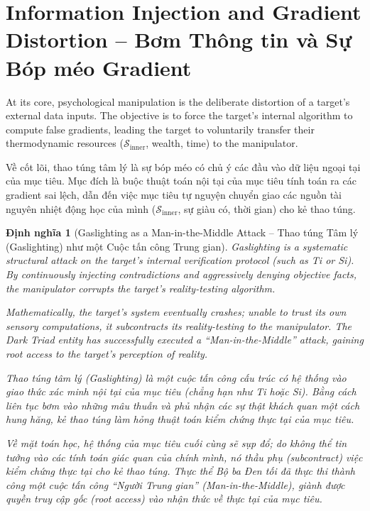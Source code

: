 \documentclass{report}
\newtheorem{dinhnghia}{Định nghĩa}
\begin{document}
\section{Information Injection and Gradient Distortion -- Bơm Thông tin và Sự Bóp méo Gradient}

At its core, psychological manipulation is the deliberate distortion of a target's external data inputs. The objective is to force the target's internal algorithm to compute false gradients, leading the target to voluntarily transfer their thermodynamic resources ($\mathcal{S}_{\text{inner}}$, wealth, time) to the manipulator.

Về cốt lõi, thao túng tâm lý là sự bóp méo có chủ ý các đầu vào dữ liệu ngoại tại của mục tiêu. Mục đích là buộc thuật toán nội tại của mục tiêu tính toán ra các gradient sai lệch, dẫn đến việc mục tiêu tự nguyện chuyển giao các nguồn tài nguyên nhiệt động học của mình ($\mathcal{S}_{\text{inner}}$, sự giàu có, thời gian) cho kẻ thao túng.

\begin{dinhnghia}[Gaslighting as a Man-in-the-Middle Attack -- Thao túng Tâm lý (Gaslighting) như một Cuộc tấn công Trung gian]
	Gaslighting is a systematic structural attack on the target's internal verification protocol (such as Ti or Si). By continuously injecting contradictions and aggressively denying objective facts, the manipulator corrupts the target's reality-testing algorithm.
	
	Mathematically, the target's system eventually crashes; unable to trust its own sensory computations, it subcontracts its reality-testing to the manipulator. The Dark Triad entity has successfully executed a ``Man-in-the-Middle'' attack, gaining root access to the target's perception of reality.
	
	Thao túng tâm lý (Gaslighting) là một cuộc tấn công cấu trúc có hệ thống vào giao thức xác minh nội tại của mục tiêu (chẳng hạn như Ti hoặc Si). Bằng cách liên tục bơm vào những mâu thuẫn và phủ nhận các sự thật khách quan một cách hung hăng, kẻ thao túng làm hỏng thuật toán kiểm chứng thực tại của mục tiêu.
	
	Về mặt toán học, hệ thống của mục tiêu cuối cùng sẽ sụp đổ; do không thể tin tưởng vào các tính toán giác quan của chính mình, nó thầu phụ (subcontract) việc kiểm chứng thực tại cho kẻ thao túng. Thực thể Bộ ba Đen tối đã thực thi thành công một cuộc tấn công ``Người Trung gian'' (Man-in-the-Middle), giành được quyền truy cập gốc (root access) vào nhận thức về thực tại của mục tiêu.
\end{dinhnghia}
\end{document}
